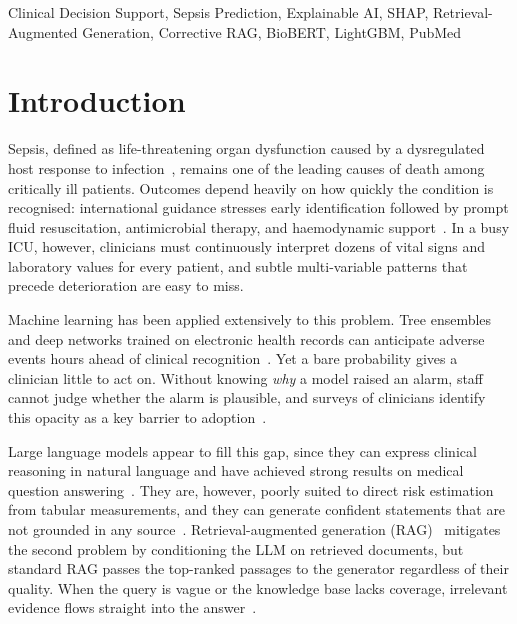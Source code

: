 \documentclass[conference]{IEEEtran}
\begin{document}
\begin{IEEEkeywords}
Clinical Decision Support, Sepsis Prediction, Explainable AI, SHAP,
Retrieval-Augmented Generation, Corrective RAG, BioBERT, LightGBM, PubMed
\end{IEEEkeywords}

\section{Introduction}

Sepsis, defined as life-threatening organ dysfunction caused by a
dysregulated host response to infection~\cite{singer2016sepsis3}, remains
one of the leading causes of death among critically ill patients. Outcomes
depend heavily on how quickly the condition is recognised: international
guidance stresses early identification followed by prompt fluid
resuscitation, antimicrobial therapy, and haemodynamic
support~\cite{evans2021ssc}. In a busy ICU, however, clinicians must
continuously interpret dozens of vital signs and laboratory values for
every patient, and subtle multi-variable patterns that precede
deterioration are easy to miss.

Machine learning has been applied extensively to this problem. Tree
ensembles and deep networks trained on electronic health records can
anticipate adverse events hours ahead of clinical
recognition~\cite{nemati2018aise,rajkomar2018ehr,reyna2020physionet}.
Yet a bare probability gives a clinician little to act on. Without knowing
\emph{why} a model raised an alarm, staff cannot judge whether the alarm is
plausible, and surveys of clinicians identify this opacity as a key barrier
to adoption~\cite{tonekaboni2019clinicians}.

Large language models appear to fill this gap, since they can express
clinical reasoning in natural language and have achieved strong results on
medical question answering~\cite{singhal2023medpalm}. They are, however,
poorly suited to direct risk estimation from tabular measurements, and they
can generate confident statements that are not grounded in any
source~\cite{ji2023hallucination}. Retrieval-augmented generation
(RAG)~\cite{lewis2020rag} mitigates the second problem by conditioning the
LLM on retrieved documents, but standard RAG passes the top-ranked passages
to the generator regardless of their quality. When the query is vague or
the knowledge base lacks coverage, irrelevant evidence flows straight into
the answer~\cite{yan2024crag}.
\end{document}
